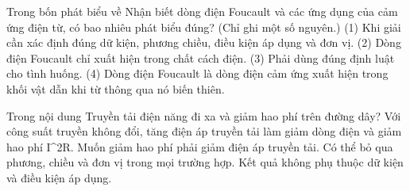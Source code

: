\begin{ex}
Trong bốn phát biểu về Nhận biết dòng điện Foucault và các ứng dụng của cảm ứng điện từ, có bao nhiêu phát biểu đúng? (Chỉ ghi một số nguyên.) (1) Khi giải cần xác định đúng dữ kiện, phương chiều, điều kiện áp dụng và đơn vị. (2) Dòng điện Foucault chỉ xuất hiện trong chất cách điện. (3) Phải dùng đúng định luật cho tình huống. (4) Dòng điện Foucault là dòng điện cảm ứng xuất hiện trong khối vật dẫn khi từ thông qua nó biến thiên.
\end{ex}

\begin{ex}
Trong nội dung Truyền tải điện năng đi xa và giảm hao phí trên đường dây?
\choice
{\True Với công suất truyền không đổi, tăng điện áp truyền tải làm giảm dòng điện và giảm hao phí I^2R.}
{Muốn giảm hao phí phải giảm điện áp truyền tải.}
{Có thể bỏ qua phương, chiều và đơn vị trong mọi trường hợp.}
{Kết quả không phụ thuộc dữ kiện và điều kiện áp dụng.}
\end{ex}

